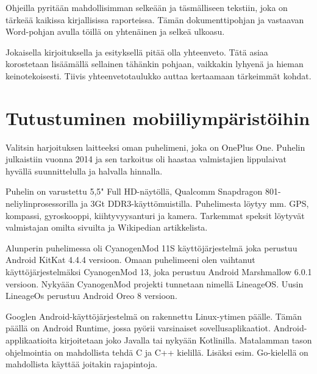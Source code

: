 \documentclass[globalnumbering,centeredcaptions,draftfooter]{tutthesis/tutthesis} %
\newif\ifnameyear
\begin{document}
Ohjeilla pyritään mahdollisimman selkeään ja täsmälliseen tekstiin, joka on tärkeää kaikissa kirjallisissa raporteissa.
Tämän dokumenttipohjan ja vastaavan Word-pohjan avulla töillä on yhtenäinen ja selkeä ulkoasu.

Jokaisella kirjoituksella ja esityksellä pitää olla yhteenveto.
Tätä asiaa korostetaan lisäämällä sellainen tähänkin pohjaan, vaikkakin lyhyenä ja hieman keinotekoisesti.
Tiivis yhteenvetotaulukko auttaa kertaamaan tärkeimmät kohdat.



\addto\extrasenglish{\btxifchangecaseoff} %

\ifnameyear
  
\else
  
\fi





\appendix

\chapter{Tutustuminen mobiiliympäristöihin}
\label{ch:harjoitus1}

Valitsin harjoituksen laitteeksi oman puhelimeni, joka on OnePlus One. Puhelin julkaistiin vuonna 2014 ja sen tarkoitus oli haastaa valmistajien lippulaivat hyvällä suunnittelulla ja halvalla hinnalla.

Puhelin on varustettu 5,5" Full HD-näytöllä, Qualcomm Snapdragon 801-neliylinprosessorilla ja 3Gt DDR3-käyttömuistilla. Puhelimesta löytyy mm. GPS, kompassi, gyroskooppi, kiihtyvyysanturi ja kamera. Tarkemmat speksit löytyvät valmistajan omilta sivuilta ja Wikipedian artikkelista.

Alunperin puhelimessa oli CyanogenMod 11S käyttöjärjestelmä joka perustuu Android KitKat 4.4.4 versioon. Omaan puhelimeeni olen vaihtanut käyttöjärjestelmäksi CyanogenMod 13, joka perustuu Android Marshmallow 6.0.1 versioon. Nykyään CyanogenMod projekti tunnetaan nimellä LineageOS. Uusin LineageOs perustuu Android Oreo 8 versioon.

Googlen Android-käyttöjärjestelmä on rakennettu Linux-ytimen päälle. Tämän päällä on Android Runtime, jossa pyörii varsinaiset sovellusaplikaatiot. Android-applikaatioita kirjoitetaan joko Javalla tai nykyään Kotlinilla. Matalamman tason ohjelmointia on mahdollista tehdä C ja C++ kielillä. Lisäksi esim. Go-kielellä on mahdollista käyttää joitakin rajapintoja.
\end{document}
